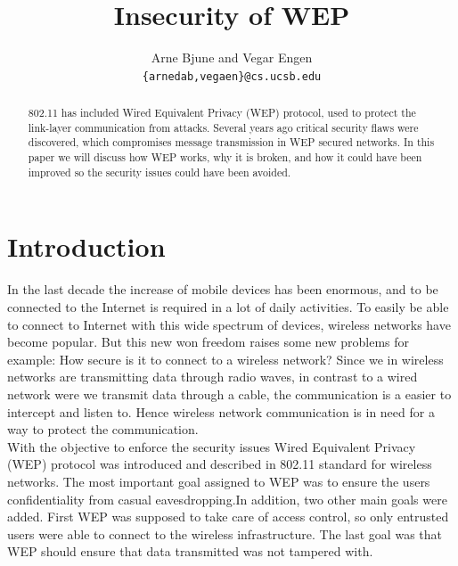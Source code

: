 \documentclass[twocolumn,11pt]{IEEEtran}
\begin{document}
\title{Insecurity of WEP}


\author{Arne Bjune and Vegar Engen \\ \texttt{\{arnedab,vegaen\}@cs.ucsb.edu}}


\maketitle

\begin{abstract}
802.11 has included Wired Equivalent Privacy (WEP) protocol, used to protect the link-layer communication from attacks. Several years ago critical security flaws were discovered, which compromises message transmission in WEP secured networks. In this paper we will discuss how WEP works, why it is broken, and how it could have been improved so the security issues could have been avoided.
\end{abstract}

\section {Introduction}
\label{sec:introduction}

In the last decade the increase of mobile devices has been enormous, and to be connected to the Internet is required in a lot of daily activities. To easily be able to connect to Internet with this wide spectrum of devices, wireless networks have become popular. But this new won freedom raises some new problems for example: How secure is it to connect to a wireless network? Since we in wireless networks are transmitting data through radio waves, in contrast to a wired network were we transmit data through a cable, the communication is a easier to intercept and listen to. Hence wireless network communication is in need for a way to protect the communication. \\


With the objective to enforce the security issues Wired Equivalent Privacy (WEP) protocol was introduced and described in 802.11 standard\cite{IEEE:Fast} for wireless networks. The most important goal assigned to WEP was to ensure the users confidentiality from casual eavesdropping.In addition, two other main goals were added. First WEP was supposed to take care of access control, so only entrusted users were able to connect to the wireless infrastructure. The last goal was that WEP should ensure that data transmitted was not tampered with.   \\
\end{document}

